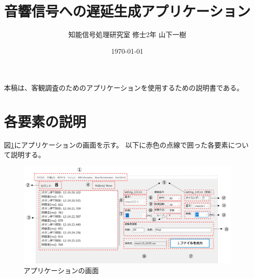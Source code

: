 \documentclass{article} %
\title{音響信号への遅延生成アプリケーション} %
\author{知能信号処理研究室 修士2年 山下一樹} %
\date{\today} %
\begin{document}
\maketitle %
本稿は、客観調査のためのアプリケーションを使用するための説明書である。
\section{各要素の説明} 
図\ref{fig:app_kyakkann}にアプリケーションの画面を示す。
以下に赤色の点線で囲った各要素について説明する。
\begin{figure}[tbp]
  \centering
  \includegraphics[scale=0.5]{figures_app_1.pdf}
  \caption{アプリケーションの画面}
  \label{fig:app_kyakkann}
\end{figure}
\end{document}

